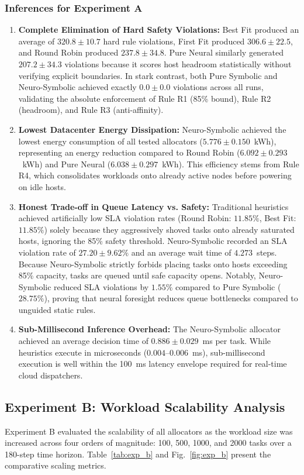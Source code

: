 \documentclass[conference]{IEEEtran}
\begin{document}
\subsubsection{Inferences for Experiment A}
\begin{enumerate}
    \item \textbf{Complete Elimination of Hard Safety Violations:} Best Fit produced an average of $320.8 \pm 10.7$ hard rule violations, First Fit produced $306.6 \pm 22.5$, and Round Robin produced $237.8 \pm 34.8$. Pure Neural similarly generated $207.2 \pm 34.3$ violations because it scores host headroom statistically without verifying explicit boundaries. In stark contrast, both Pure Symbolic and Neuro-Symbolic achieved exactly $\mathbf{0.0 \pm 0.0}$ violations across all runs, validating the absolute enforcement of Rule R1 (85\% bound), Rule R2 (headroom), and Rule R3 (anti-affinity).
    \item \textbf{Lowest Datacenter Energy Dissipation:} Neuro-Symbolic achieved the lowest energy consumption of all tested allocators ($5.776 \pm 0.150$~kWh), representing an energy reduction compared to Round Robin ($6.092 \pm 0.293$~kWh) and Pure Neural ($6.038 \pm 0.297$~kWh). This efficiency stems from Rule R4, which consolidates workloads onto already active nodes before powering on idle hosts.
    \item \textbf{Honest Trade-off in Queue Latency vs. Safety:} Traditional heuristics achieved artificially low SLA violation rates (Round Robin: $11.85\%$, Best Fit: $11.85\%$) solely because they aggressively shoved tasks onto already saturated hosts, ignoring the 85\% safety threshold. Neuro-Symbolic recorded an SLA violation rate of $27.20 \pm 9.62\%$ and an average wait time of $4.273$~steps. Because Neuro-Symbolic strictly forbids placing tasks onto hosts exceeding 85\% capacity, tasks are queued until safe capacity opens. Notably, Neuro-Symbolic reduced SLA violations by $1.55\%$ compared to Pure Symbolic ($28.75\%$), proving that neural foresight reduces queue bottlenecks compared to unguided static rules.
    \item \textbf{Sub-Millisecond Inference Overhead:} The Neuro-Symbolic allocator achieved an average decision time of $0.886 \pm 0.029$~ms per task. While heuristics execute in microseconds ($0.004$--$0.006$~ms), sub-millisecond execution is well within the 100~ms latency envelope required for real-time cloud dispatchers.
\end{enumerate}

\subsection{Experiment B: Workload Scalability Analysis}
Experiment B evaluated the scalability of all allocators as the workload size was increased across four orders of magnitude: 100, 500, 1000, and 2000 tasks over a 180-step time horizon. Table~\ref{tab:exp_b} and Fig.~\ref{fig:exp_b} present the comparative scaling metrics.
\end{document}
